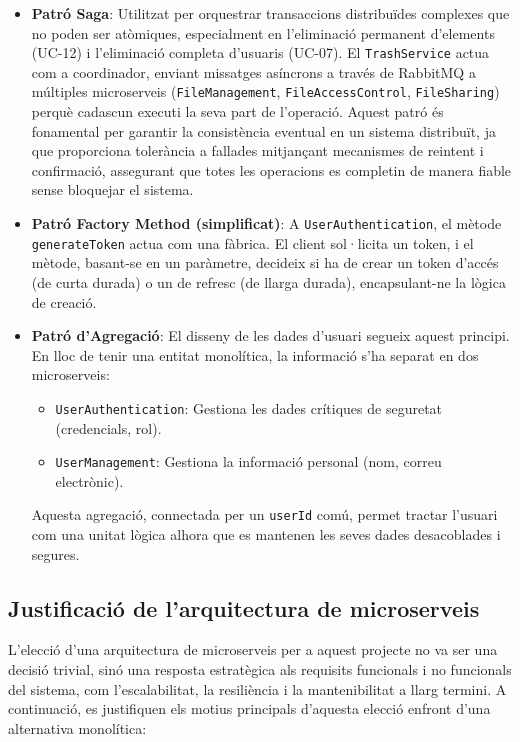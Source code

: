 \begin{itemize}
    \item \textbf{Patró Saga}: Utilitzat per orquestrar transaccions distribuïdes complexes que no poden ser atòmiques, especialment en l'eliminació permanent d'elements (UC-12) i l'eliminació completa d'usuaris (UC-07). El \texttt{TrashService} actua com a coordinador, enviant missatges asíncrons a través de RabbitMQ a múltiples microserveis (\texttt{FileManagement}, \texttt{FileAccessControl}, \texttt{FileSharing}) perquè cadascun executi la seva part de l'operació. Aquest patró és fonamental per garantir la consistència eventual en un sistema distribuït, ja que proporciona tolerància a fallades mitjançant mecanismes de reintent i confirmació, assegurant que totes les operacions es completin de manera fiable sense bloquejar el sistema.

    \item \textbf{Patró Factory Method (simplificat)}: A \texttt{UserAuthentication}, el mètode \texttt{generateToken} actua com una fàbrica. El client sol·licita un token, i el mètode, basant-se en un paràmetre, decideix si ha de crear un token d'accés (de curta durada) o un de refresc (de llarga durada), encapsulant-ne la lògica de creació.

    \item \textbf{Patró d'Agregació}: El disseny de les dades d'usuari segueix aquest principi. En lloc de tenir una entitat monolítica, la informació s'ha separat en dos microserveis:
    \begin{itemize}
        \item \texttt{UserAuthentication}: Gestiona les dades crítiques de seguretat (credencials, rol).
        \item \texttt{UserManagement}: Gestiona la informació personal (nom, correu electrònic).
    \end{itemize}
    Aquesta agregació, connectada per un \texttt{userId} comú, permet tractar l'usuari com una unitat lògica alhora que es mantenen les seves dades desacoblades i segures.
\end{itemize}

\subsection{Justificació de l'arquitectura de microserveis}
L'elecció d'una arquitectura de microserveis per a aquest projecte no va ser una decisió trivial, sinó una resposta estratègica als requisits funcionals i no funcionals del sistema, com l'escalabilitat, la resiliència i la mantenibilitat a llarg termini. A continuació, es justifiquen els motius principals d'aquesta elecció enfront d'una alternativa monolítica:


